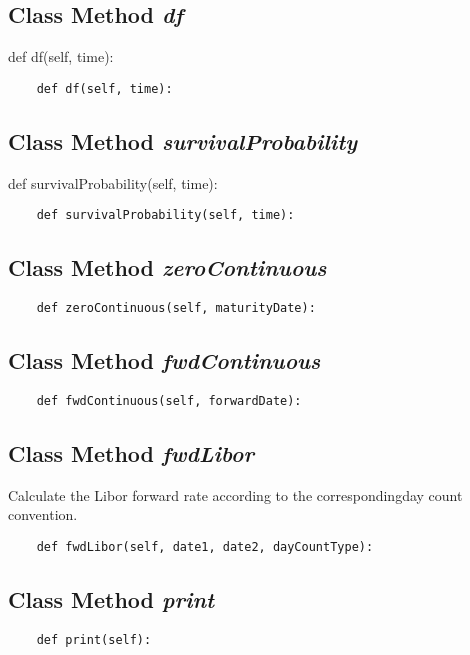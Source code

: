 \documentclass[twoside,11pt]{book}
\begin{document}
\subsection{Class Method {\it df}}
def df(self, time):

\begin{lstlisting}
    def df(self, time):
\end{lstlisting}

\subsection{Class Method {\it survivalProbability}}
def survivalProbability(self, time):

\begin{lstlisting}
    def survivalProbability(self, time):
\end{lstlisting}

\subsection{Class Method {\it zeroContinuous}}


\begin{lstlisting}
    def zeroContinuous(self, maturityDate):
\end{lstlisting}

\subsection{Class Method {\it fwdContinuous}}


\begin{lstlisting}
    def fwdContinuous(self, forwardDate):
\end{lstlisting}

\subsection{Class Method {\it fwdLibor}}
Calculate the Libor forward rate according to the correspondingday count convention. 

\begin{lstlisting}
    def fwdLibor(self, date1, date2, dayCountType):
\end{lstlisting}

\subsection{Class Method {\it print}}


\begin{lstlisting}
    def print(self):
\end{lstlisting}
\end{document}
